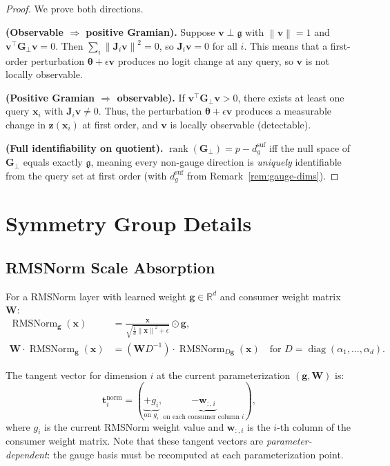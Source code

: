 \documentclass{article}
\newcommand{\R}{\mathbb{R}}
\newcommand{\btheta}{\boldsymbol{\theta}}
\newcommand{\bz}{\mathbf{z}}
\newcommand{\bx}{\mathbf{x}}
\newcommand{\bW}{\mathbf{W}}
\newcommand{\bJ}{\mathbf{J}}
\newcommand{\bG}{\mathbf{G}}
\newcommand{\norm}[1]{\left\lVert #1 \right\rVert}
\DeclareMathOperator{\diag}{diag}
\DeclareMathOperator{\rank}{rank}
\DeclareMathOperator{\RMSNorm}{RMSNorm}
\begin{document}
\begin{proof}
We prove both directions.

\textbf{(Observable $\Rightarrow$ positive Gramian).} Suppose $\mathbf{v} \perp \mathfrak{g}$ with $\norm{\mathbf{v}} = 1$ and $\mathbf{v}^\top \bG_\perp \mathbf{v} = 0$. Then $\sum_i \norm{\bJ_i \mathbf{v}}^2 = 0$, so $\bJ_i \mathbf{v} = 0$ for all $i$. This means that a first-order perturbation $\btheta + \epsilon \mathbf{v}$ produces no logit change at any query, so $\mathbf{v}$ is not locally observable.

\textbf{(Positive Gramian $\Rightarrow$ observable).} If $\mathbf{v}^\top \bG_\perp \mathbf{v} > 0$, there exists at least one query $\bx_i$ with $\bJ_i \mathbf{v} \neq 0$. Thus, the perturbation $\btheta + \epsilon \mathbf{v}$ produces a measurable change in $\bz(\bx_i)$ at first order, and $\mathbf{v}$ is locally observable (detectable).

\textbf{(Full identifiability on quotient).} $\rank(\bG_\perp) = p - d_g^{\text{suf}}$ iff the null space of $\bG_\perp$ equals exactly $\mathfrak{g}$, meaning every non-gauge direction is \emph{uniquely} identifiable from the query set at first order (with $d_g^{\text{suf}}$ from Remark~\ref{rem:gauge-dims}).
\end{proof}

\section{Symmetry Group Details}
\label{app:symmetry}

\subsection{RMSNorm Scale Absorption}

For a RMSNorm layer with learned weight $\mathbf{g} \in \R^d$ and consumer weight matrix $\bW$:
\begin{align}
 \RMSNorm_{\mathbf{g}}(\bx) &= \frac{\bx}{\sqrt{\frac{1}{d}\norm{\bx}^2 + \epsilon}} \odot \mathbf{g}, \\
 \bW \cdot \RMSNorm_{\mathbf{g}}(\bx) &= (\bW D^{-1}) \cdot \RMSNorm_{D\mathbf{g}}(\bx) \quad \text{for } D = \diag(\alpha_1, \ldots, \alpha_d).
\end{align}

The tangent vector for dimension $i$ at the current parameterization $(\mathbf{g}, \bW)$ is:
\begin{equation}
 \mathbf{t}_i^{\text{norm}} = (\underbrace{+g_i}_{\text{on } g_i}, \underbrace{-\mathbf{w}_{:,i}}_{\text{on each consumer column } i}),
\end{equation}
where $g_i$ is the current RMSNorm weight value and $\mathbf{w}_{:,i}$ is the $i$-th column of the consumer weight matrix. Note that these tangent vectors are \emph{parameter-dependent}: the gauge basis must be recomputed at each parameterization point.
\end{document}
